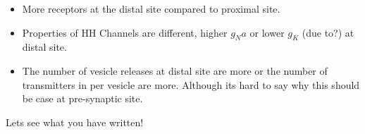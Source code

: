 \documentclass[a4paper,10pt]{article}
\begin{document}
\begin{itemize}
    \item More receptors at the distal site compared to proximal site.
    \item Properties of HH Channels are different, higher $g_Na$ or lower $g_K$ (due
        to?) at distal site.
    \item The number of vesicle releases at distal site are more or the number
        of transmitters in per vesicle are more. Although its hard to say why
        this should be case at pre-synaptic site.
\end{itemize}

Lets see what you have written!
\end{document}
